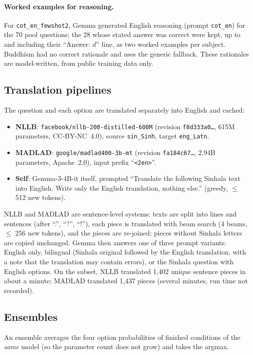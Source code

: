 \documentclass[10pt,a4paper]{article}
\newcommand{\cond}[1]{\texttt{#1}}
\begin{document}
\paragraph{Worked examples for reasoning.} For \cond{cot\_en\_fewshot2}, Gemma generated English reasoning (prompt
\cond{cot\_en}) for the 70 pool questions; the 28 whose stated answer was correct were kept, up to and including
their ``Answer: $d$'' line, as two worked examples per subject. Buddhism had no correct rationale and uses the generic
fallback. These rationales are model-written, from public training data only.

\subsection{Translation pipelines}\label{sec:translate}
The question and each option are translated separately into English and cached:
\begin{itemize}
\item \textbf{NLLB}: \texttt{facebook/nllb-200-distilled-600M} \cite{nllb2022} (revision \texttt{f8d333a0\ldots},
615M parameters, CC-BY-NC~4.0), source \texttt{sin\_Sinh}, target \texttt{eng\_Latn}.
\item \textbf{MADLAD}: \texttt{google/madlad400-3b-mt} \cite{madlad2023} (revision \texttt{fa184c67\ldots}, 2.94B
parameters, Apache~2.0), input prefix ``\texttt{<2en>}''.
\item \textbf{Self}: Gemma-3-4B-it itself, prompted ``Translate the following Sinhala text into English. Write only the
English translation, nothing else.'' (greedy, $\le$ 512 new tokens).
\end{itemize}
NLLB and MADLAD are sentence-level systems: texts are split into lines and sentences (after ``.'', ``?'', ``!''),
each piece is translated with beam search (4 beams, $\le$ 256 new tokens), and the pieces are re-joined;
pieces without Sinhala letters are copied unchanged. Gemma then answers one of three prompt variants: English only,
bilingual (Sinhala original followed by the English translation, with a note that the translation may contain errors),
or the Sinhala question with English options. On the subset, NLLB translated 1,402 unique sentence pieces in about a
minute; MADLAD translated 1,437 pieces (several minutes, run time not recorded).

\subsection{Ensembles}
An ensemble averages the four option probabilities of finished conditions of the \emph{same} model (so the parameter
count does not grow) and takes the argmax.
\end{document}
